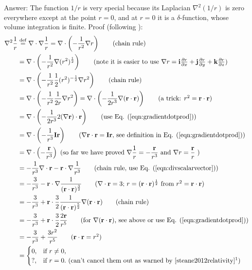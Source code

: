 \documentclass[11pt]{article}              %
\begin{document}
Answer: The function $1/r$ is very special because its Laplacian $\nabla^2 (1/r)$ is zero everywhere except at the point $r=0$, and at $r=0$ it is a $\delta$-function, whose volume integration is finite. Proof (following \cite{steane2012relativity}): 
\begin{align}
	\nabla^2\frac{1}{r}&\stackrel{\operatorname{def}}{=}\nabla\cdot\nabla\frac{1}{r}=\nabla\cdot\left(-\frac{1}{r^2}\nabla r\right)\tag{chain rule}\\
    &=\nabla\cdot\left(-\frac{1}{r^2}\nabla (r^2)^\frac{1}{2}\right)\tag{note it is easier to use $\nabla r={\mathbf{i}\frac{\partial r}{\partial x}+\mathbf{j}\frac{\partial r}{\partial y}+\mathbf{k}\frac{\partial r}{\partial z}}$}\\
    &=\nabla\cdot\left(-\frac{1}{r^2}\frac{1}{2}(r^2)^{-\frac{1}{2}}\nabla r^2\right)\tag{chain rule}\\
	&=\nabla\cdot\left(-\frac{1}{r^2}\frac{1}{2r}\nabla r^2\right)=\nabla\cdot\left(-\frac{1}{2r^3}\nabla ({\mathbf r}\cdot{\mathbf r})\right)\tag{a trick: $r^2={\mathbf r}\cdot{\mathbf r}$}\\
	&=\nabla\cdot\left(-\frac{1}{2r^3}2(\nabla{\mathbf r})\cdot{\mathbf r}\right)\tag{use Eq. (\ref{eqn:gradientdotprod})}\\
    &=\nabla\cdot\left(-\frac{1}{r^3}{\mathbf I}{\mathbf r}\right)\tag{$\nabla{\mathbf r}\cdot{\mathbf r}={\mathbf {Ir}}$, see definition in Eq. (\ref{eqn:gradientdotprod})}\\
	&=\nabla\cdot\left(-\frac{\mathbf r}{r^3}\right)\ \mbox{(so far we have proved }\nabla\frac{1}{r}=-\frac{\mathbf r}{r^3}\mbox{ and }\nabla r=\frac{\mathbf r}{r} \mbox{ )}\label{nablar}\\
	&=-\frac{1}{r^3}\nabla\cdot{\mathbf r}-{\mathbf r}\cdot\nabla\frac{1}{r^3}\tag{chain rule, use Eq. (\ref{eqn:divscalarvector})}\\
	&=-\frac{3}{r^3}-{\mathbf r}\cdot\nabla\frac{1}{({\mathbf r}\cdot{\mathbf r})^\frac{3}{2}}\tag{$\nabla\cdot{\mathbf r}=3$; $r=({\mathbf r}\cdot{\mathbf r})^\frac{1}{2}$ from $r^2={\mathbf r}\cdot{\mathbf r}$}\\
	&=-\frac{3}{r^3}+{\mathbf r}\cdot\frac{3}{2}\frac{1}{({\mathbf r}\cdot{\mathbf r})^\frac{5}{2}}\nabla({\mathbf r}\cdot{\mathbf r})\tag{chain rule}\\
	&=-\frac{3}{r^3}+{\mathbf r}\cdot\frac{3}{2}\frac{2{\mathbf r}}{r^5}\tag{for $\nabla({\mathbf r}\cdot{\mathbf r})$, see above or use Eq. (\ref{eqn:gradientdotprod})}\\
	&=-\frac{3}{r^3}+\frac{3r^2}{r^5}\tag{${\mathbf r}\cdot{\mathbf r}=r^2$}\\
        &=\begin{cases}
		0,& \text{if } r \neq 0,\\
		?,& \text{if } r = 0.\mbox{ (can't cancel them out as warned by \cite{steane2012relativity}\footnotemark)}
	\end{cases}\label{cancelzero}
\end{align}
\end{document}
